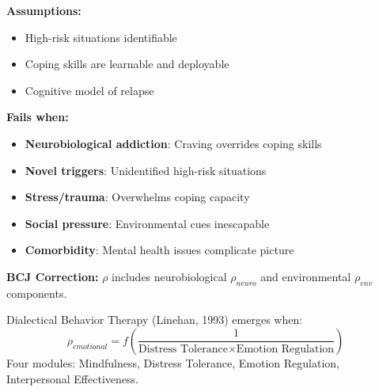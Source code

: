 \begin{tcolorbox}[colback=red!5!white, colframe=red!75!black, title=Boundary Condition: Where Relapse Prevention Fails]
\textbf{Assumptions:}
\begin{itemize}[nosep]
\item High-risk situations identifiable
\item Coping skills are learnable and deployable
\item Cognitive model of relapse
\end{itemize}

\textbf{Fails when:}
\begin{itemize}[nosep]
\item \textbf{Neurobiological addiction}: Craving overrides coping skills
\item \textbf{Novel triggers}: Unidentified high-risk situations
\item \textbf{Stress/trauma}: Overwhelms coping capacity
\item \textbf{Social pressure}: Environmental cues inescapable
\item \textbf{Comorbidity}: Mental health issues complicate picture
\end{itemize}

\textbf{BCJ Correction:} $\rho$ includes neurobiological $\rho_{neuro}$ and environmental $\rho_{env}$ components.
\end{tcolorbox}


\begin{theorem}
\label{thm:dbt}
Dialectical Behavior Therapy (Linehan, 1993) emerges when:
\begin{equation}
\boxed{\rho_{emotional} = f\left(\frac{1}{\text{Distress Tolerance} \times \text{Emotion Regulation}}\right)}
\end{equation}
Four modules: Mindfulness, Distress Tolerance, Emotion Regulation, Interpersonal Effectiveness.
\end{theorem}

